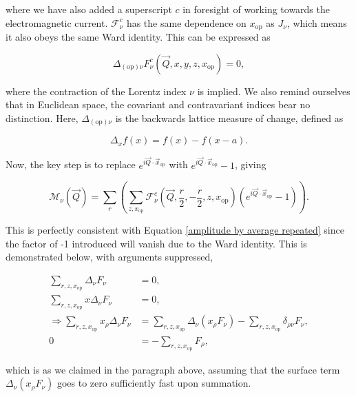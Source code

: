 \documentclass{article}
\numberwithin{equation}{section} %
\begin{document}
\noindent where we have also added a superscript $c$ in foresight of working towards the electromagnetic current. $\mathcal{F}^c_\nu$ has the same dependence on $x_\mathrm{op}$ as $J_\nu$, which means it also obeys the same Ward identity. This can be expressed as 

\begin{equation}
\Delta_{\mathrm{(op)}\nu}F^c_\nu(\vec{Q},x,y,z,x_\mathrm{op})=0,
\end{equation}

\noindent where the contraction of the Lorentz index $\nu$ is implied. We also remind ourselves that in Euclidean space, the covariant and contravariant indices bear no distinction. Here, $\Delta_{\mathrm{(op)}\nu}$ is the backwards lattice measure of change, defined as 

\begin{equation}
\Delta_xf(x) = f(x) - f(x-a).
\end{equation}

Now, the key step is to replace $e^{i\vec{Q}\cdot\vec{x}_\mathrm{op}}$ with $e^{i\vec{Q}\cdot\vec{x}_\mathrm{op}}-1$, giving

\begin{equation}
\mathcal{M}_\nu(\vec{Q})= \sum_r\left(\sum_{z,x_\mathrm{op}} \mathcal{F}^c_\nu(\vec{Q},\frac{r}{2},-\frac{r}{2},z,x_\mathrm{op})(e^{i\vec{Q}\cdot\vec{x}_\mathrm{op}}-1)\right).
\label{amplitude by average -1}
\end{equation}

This is perfectly consistent with Equation \ref{amplitude by average repeated} since the factor of -1 introduced will vanish due to the Ward identity. This is demonstrated below, with arguments suppressed,

\begin{equation}
\begin{split}
\sum_{r,z,x_\mathrm{op}}\Delta_\nu F_\nu &= 0,\\
\sum_{r,z,x_\mathrm{op}}x\Delta_\nu F_\nu &= 0,\\
\Rightarrow\sum_{r,z,x_\mathrm{op}}x_\rho\Delta_\nu F_\nu &= \sum_{r,z,x_\mathrm{op}} \Delta_\nu (x_\rho F_\nu) - \sum_{r,z,x_\mathrm{op}}\delta_{\rho\nu}F_\nu,\\
0&= -\sum_{r,z,x_\mathrm{op}}F_\rho,
\end{split}
\end{equation}

\noindent which is as we claimed in the paragraph above, assuming that the surface term $\Delta_\nu(x_\rho F_\nu)$ goes to zero sufficiently fast upon summation.
\end{document}
